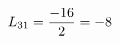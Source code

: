 \documentclass[preview]{standalone}
\begin{document}
\begin{align*}
\special{dvisvgm:raw <g id='unique000'>}L_{31}=\frac{-16}{2}=-8\special{dvisvgm:raw </g>}
\end{align*}
\end{document}
